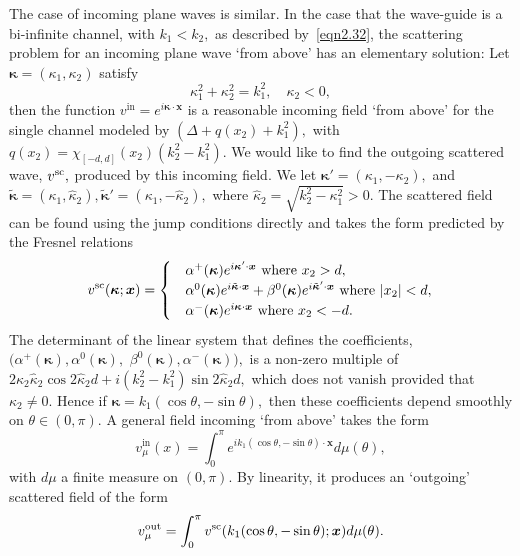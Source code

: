 \documentclass[11pt]{article}
\newcommand\In{\operatorname{in}}
\newcommand\out{\operatorname{out}}
\newcommand\bkappa{\boldsymbol \kappa}
\newcommand\tbkappa{\tilde{\bkappa}}
\newcommand\bx{\boldsymbol x}
\theoremstyle{definition}
\theoremstyle{remark}
\begin{document}
 The case of incoming plane waves is similar. 
In the case that the wave-guide is a bi-infinite channel, with $k_1<k_2,$ as described
by~\eqref{eqn2.32}, the scattering problem for an incoming plane wave
`from above' has an elementary solution: Let $\bkappa=(\kappa_1,\kappa_2)$ satisfy
\begin{equation}
  \kappa_1^2+\kappa_2^2=k_1^2, \quad \kappa_2<0,
\end{equation}
then the function $v^{\In}=e^{i\bkappa\cdot\bx}$ is a reasonable incoming field
`from above' for the single channel modeled by $(\Delta+q(x_2)+k_1^2),$ with
$q(x_2)=\chi_{[-d,d]}(x_2)(k_2^2-k_1^2).$ We would like to find the outgoing
scattered wave, $v^{\operatorname{sc}},$ produced by this incoming field. We let
$\bkappa'=(\kappa_1,-\kappa_2),$ and $\tbkappa=(\kappa_1,\hat{\kappa}_2),
\tbkappa'=(\kappa_1,-\hat{\kappa}_2),$ where
$\hat{\kappa}_2=\sqrt{k_2^2-\kappa_1^2}>0.$ The scattered field can be found
using the jump conditions directly and takes the form predicted by the Fresnel
relations
\begin{equation}
  v^{\scat}(\bkappa;\bx)=\begin{cases}&\alpha^+(\bkappa)e^{i\bkappa'\cdot\bx}\text{ where
  }x_2>d,\\
  &\alpha^0(\bkappa)e^{i\tbkappa\cdot\bx}+\beta^0(\bkappa)e^{i\tbkappa'\cdot\bx}\text{ where }|x_2|<d,\\
  &\alpha^-(\bkappa)e^{i\bkappa\cdot\bx}\text{ where }x_2<-d.
  \end{cases}
\end{equation}
The determinant of the linear system that defines the coefficients,
$(\alpha^+(\bkappa),\alpha^0(\bkappa),$ $\beta^0(\bkappa),\alpha^-(\bkappa)),$
is a non-zero multiple of $2\kappa_2\hat{\kappa}_2\cos
2\hat{\kappa}_2d+i(k_2^2-k_1^2)\sin2\hat{\kappa}_2d,$ which does not vanish
provided that $\kappa_2\neq 0.$ Hence if $\bkappa=k_1(\cos\theta,-\sin\theta),$
then these coefficients depend smoothly on $\theta\in (0,\pi).$ A general field
incoming `from above' takes the form
\begin{equation}\label{eqn6.80}
  v^{\In}_{\mu}(x)=\int_{0}^{\pi} e^{ik_1(\cos\theta,-\sin\theta)\cdot\bx}d\mu(\theta),
\end{equation}
with $d\mu$ a finite measure on $(0,\pi).$
By linearity, it produces an `outgoing' scattered field of the form
\begin{equation}
  v^{\out}_{\mu}=\int_{0}^{\pi} v^{\scat}(k_1(\cos\theta,-\sin\theta);\bx) d\mu(\theta).
\end{equation}
\end{document}
